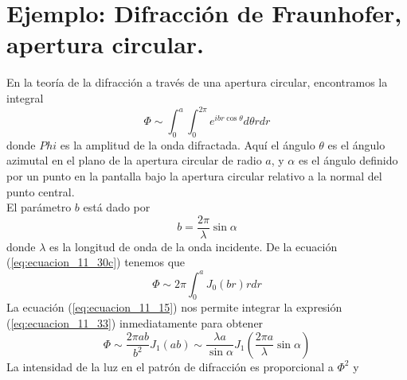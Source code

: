\section{Ejemplo: Difracción de Fraunhofer, apertura circular.}
\usetikzlibrary{shapes,snakes}
\begin{figure}[!h]
\centering
{}
\end{figure}
En la teoría de la difracción a través de una apertura circular, encontramos la integral
\begin{equation}
\Phi \sim \int_{0}^{a} \int_{0}^{2 \pi} e^{ibr \cos \theta} d \theta r dr
\label{eq:ecuacion_11_31}
\end{equation}
donde $Phi$ es la amplitud de la onda difractada. Aquí el ángulo $\theta$ es el ángulo azimutal en el plano de la apertura circular de radio $a$, y $\alpha$ es el ángulo definido por un punto en la pantalla bajo la apertura circular relativo a la normal del punto central.
\\
El parámetro $b$ está dado por
\begin{equation}
b = \dfrac{2 \pi}{\lambda} \sin \alpha
\label{eq:ecuacion_11_32}
\end{equation}
donde $\lambda$ es la longitud de onda de la onda incidente. De la ecuación (\ref{eq:ecuacion_11_30c}) tenemos que
\begin{equation}
\Phi \sim 2 \pi \int_{0}^{a} J_{0} (br) r dr 
\label{eq:ecuacion_11_33}
\end{equation}
La ecuación (\ref{eq:ecuacion_11_15}) nos permite integrar la expresión (\ref{eq:ecuacion_11_33}) inmediatamente para obtener
\begin{equation}
\Phi \sim \dfrac{2 \pi a b}{b^{2}} J_{1} (ab) \sim \dfrac{\lambda a}{\sin \alpha} J_{1} \left( \dfrac{2 \pi a}{\lambda} \sin \alpha \right)
\label{eq:ecuacion_11_34}
\end{equation}
La intensidad de la luz en el patrón de difracción es proporcional a $\Phi^{2}$ y
